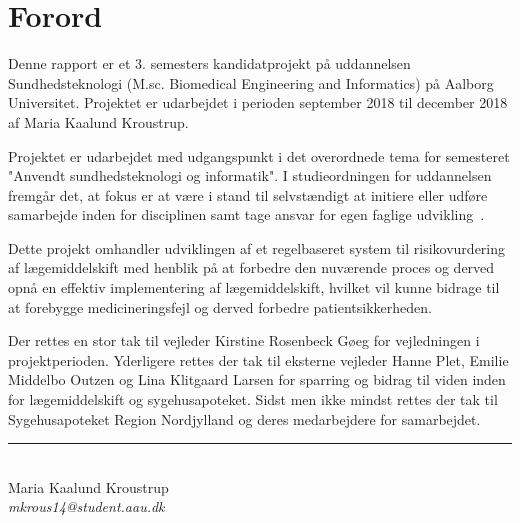 \chapter*{Forord}
Denne rapport er et 3. semesters kandidatprojekt på uddannelsen Sundhedsteknologi (M.sc. Biomedical Engineering and Informatics) på Aalborg Universitet. Projektet er udarbejdet i perioden september 2018 til december 2018 af Maria Kaalund Kroustrup. 

Projektet er udarbejdet med udgangspunkt i det overordnede tema for semesteret "Anvendt sundhedsteknologi og informatik". I studieordningen for uddannelsen fremgår det, at fokus er at være i stand til selvstændigt at initiere eller udføre samarbejde inden for disciplinen samt tage ansvar for egen faglige udvikling~\citep{Studieordning2011}. 

Dette projekt omhandler udviklingen af et regelbaseret system til risikovurdering af lægemiddelskift med henblik på at forbedre den nuværende proces og derved opnå en effektiv implementering af lægemiddelskift, hvilket vil kunne bidrage til at forebygge medicineringsfejl og derved forbedre patientsikkerheden. 

Der rettes en stor tak til vejleder Kirstine Rosenbeck Gøeg for vejledningen i projektperioden. Yderligere rettes der tak til eksterne vejleder Hanne Plet, Emilie Middelbo Outzen og Lina Klitgaard Larsen for sparring og bidrag til viden inden for lægemiddelskift og sygehusapoteket. Sidst men ikke mindst rettes der tak til Sygehusapoteket Region Nordjylland og deres medarbejdere for samarbejdet. 

\vspace{1.5cm}
\begin{center}
\rule{6cm}{0.4pt} \\
Maria Kaalund Kroustrup \\
\textit{mkrous14@student.aau.dk}
\end{center}